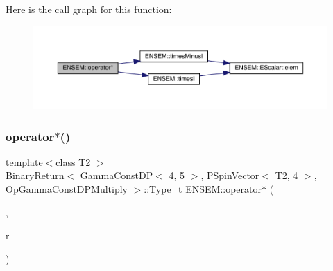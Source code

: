 Here is the call graph for this function\+:\nopagebreak
\begin{figure}[H]
\begin{center}
\leavevmode
\includegraphics[width=350pt]{dd/d6d/group__primspinvector_ga8651c7707116b78fc19958171acaabfd_cgraph}
\end{center}
\end{figure}
\mbox{\label{group__primspinvector_gaedbd65630192bc0f45ecad29cfa08152}} 
\subsubsection{\texorpdfstring{operator$\ast$()}{operator*()}\hspace{0.1cm}{\footnotesize\ttfamily [22/32]}}
{\footnotesize\ttfamily template$<$class T2 $>$ \\
\mbox{\hyperlink{structENSEM_1_1BinaryReturn}{Binary\+Return}}$<$ \mbox{\hyperlink{classENSEM_1_1GammaConstDP}{Gamma\+Const\+DP}}$<$ 4, 5 $>$, \mbox{\hyperlink{classENSEM_1_1PSpinVector}{P\+Spin\+Vector}}$<$ T2, 4 $>$, \mbox{\hyperlink{structENSEM_1_1OpGammaConstDPMultiply}{Op\+Gamma\+Const\+D\+P\+Multiply}} $>$\+::Type\+\_\+t E\+N\+S\+E\+M\+::operator$\ast$ (\begin{DoxyParamCaption}\item[{const \mbox{\hyperlink{classENSEM_1_1GammaConstDP}{Gamma\+Const\+DP}}$<$ 4, 5 $>$ \&}]{,  }\item[{const \mbox{\hyperlink{classENSEM_1_1PSpinVector}{P\+Spin\+Vector}}$<$ T2, 4 $>$ \&}]{r }\end{DoxyParamCaption})\hspace{0.3cm}{\ttfamily [inline]}}

\mbox{\label{group__primspinvector_ga118f057eadddaebf7485ca26d25ad24f}} 
